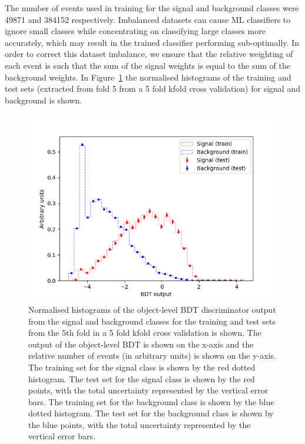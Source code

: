 The number of events used in training for the signal and background classes were 49871 and 384152 respectively. Imbalanced datasets can cause ML classifiers to ignore small classes while concentrating on classifying large classes more accurately, which may result in the trained classifier performing sub-optimally. In order to correct this dataset imbalance, we ensure that the relative weighting of each event is such that the sum of the signal weights is equal to the sum of the background weights.
In Figure~\ref{fig:object-bdt-overtrain-check} the normalised histograms of the training and test sets (extracted from fold 5 from a 5 fold kfold cross validation) for signal and background is shown.


\begin{figure}[h!]
	\includegraphics[scale=0.8]{figures/overtrainingCheck_4lep_lb.png}
	\centering
	\caption{Normalised histograms of the object-level BDT discriminator output from the signal and background classes for the training and test sets from the 5th fold in a 5 fold kfold cross validation is shown. The output of the object-level BDT is shown on the x-axis and the relative number of events (in arbitrary units) is shown on the y-axis. The training set for the signal class is shown by the red dotted histogram. The test set for the signal class is shown by the red points, with the total uncertainty represented by the vertical error bars. The training set for the background class is shown by the blue dotted histogram. The test set for the background class is shown by the blue points, with the total uncertainty represented by the vertical error bars.}
	\label{fig:object-bdt-overtrain-check}
\end{figure}

